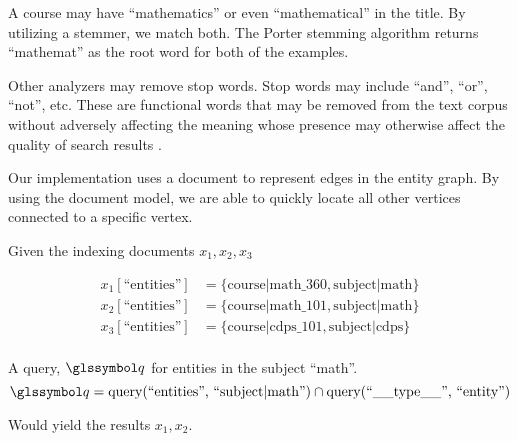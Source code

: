 			\begin{ex}
				A course may have ``mathematics'' or even ``mathematical'' in the title.  By utilizing a stemmer, we match both.  The Porter stemming algorithm returns ``mathemat'' as the root word for both of the examples.
			\end{ex}
			
			Other analyzers may remove stop words.  Stop words may include ``and'', ``or'', ``not'', etc.  These are functional words that may be removed from the text corpus without adversely affecting the meaning whose presence may otherwise affect the quality of search results \cite{silva-03}.
			
			Our implementation uses a document to represent edges in the entity graph.  By using the document model, we are able to quickly locate all other vertices connected to a specific vertex.
			
			\begin{ex}
				Given the indexing documents \(x_1, x_2, x_3\)
				
				\begin{align*}
					x_1[\text{``entities''}] &= \{\text{course|math\_360}, \text{subject|math}\} \\
					x_2[\text{``entities''}] &= \{\text{course|math\_101}, \text{subject|math}\} \\
					x_3[\text{``entities''}] &= \{\text{course|cdps\_101}, \text{subject|cdps}\} \\
				\end{align*}
				
				A query, \(\q\) for entities in the subject ``math''.
				\[
					\q = \query(\text{``entities'', ``subject|math''}) \cap \query(\text{``\_\_type\_\_'', ``entity''})
				\]
				
				Would yield the results \(x_1, x_2\).
			\end{ex}
			
		
